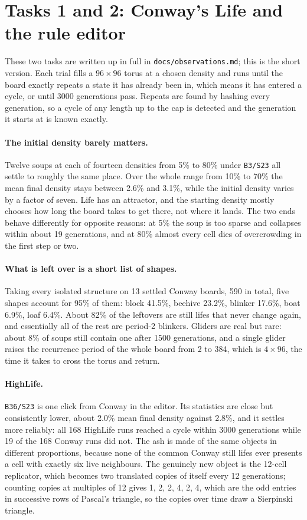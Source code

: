 \documentclass[11pt]{article}
\newcommand{\rulename}[1]{\texttt{#1}}
\begin{document}
\section{Tasks 1 and 2: Conway's Life and the rule editor}

These two tasks are written up in full in \texttt{docs/observations.md}; this is the short version.
Each trial fills a $96\times96$ torus at a chosen density and runs until the board exactly repeats a
state it has already been in, which means it has entered a cycle, or until 3000 generations pass.
Repeats are found by hashing every generation, so a cycle of any length up to the cap is detected
and the generation it starts at is known exactly.

\paragraph{The initial density barely matters.} Twelve soups at each of fourteen densities from 5\%
to 80\% under \rulename{B3/S23} all settle to roughly the same place. Over the whole range from 10\%
to 70\% the mean final density stays between 2.6\% and 3.1\%, while the initial density varies by a
factor of seven. Life has an attractor, and the starting density mostly chooses how long the board
takes to get there, not where it lands. The two ends behave differently for opposite reasons: at 5\%
the soup is too sparse and collapses within about 19 generations, and at 80\% almost every cell dies
of overcrowding in the first step or two.

\paragraph{What is left over is a short list of shapes.} Taking every isolated structure on 13
settled Conway boards, 590 in total, five shapes account for 95\% of them: block 41.5\%, beehive
23.2\%, blinker 17.6\%, boat 6.9\%, loaf 6.4\%. About 82\% of the leftovers are still lifes that
never change again, and essentially all of the rest are period-2 blinkers. Gliders are real but
rare: about 8\% of soups still contain one after 1500 generations, and a single glider raises the
recurrence period of the whole board from 2 to 384, which is $4\times96$, the time it takes to cross
the torus and return.

\paragraph{HighLife.} \rulename{B36/S23} is one click from Conway in the editor. Its statistics are
close but consistently lower, about 2.0\% mean final density against 2.8\%, and it settles more
reliably: all 168 HighLife runs reached a cycle within 3000 generations while 19 of the 168 Conway
runs did not. The ash is made of the same objects in different proportions, because none of the
common Conway still lifes ever presents a cell with exactly six live neighbours. The genuinely new
object is the 12-cell replicator, which becomes two translated copies of itself every 12
generations; counting copies at multiples of 12 gives 1, 2, 2, 4, 2, 4, which are the odd entries in
successive rows of Pascal's triangle, so the copies over time draw a Sierpinski triangle.
\end{document}
